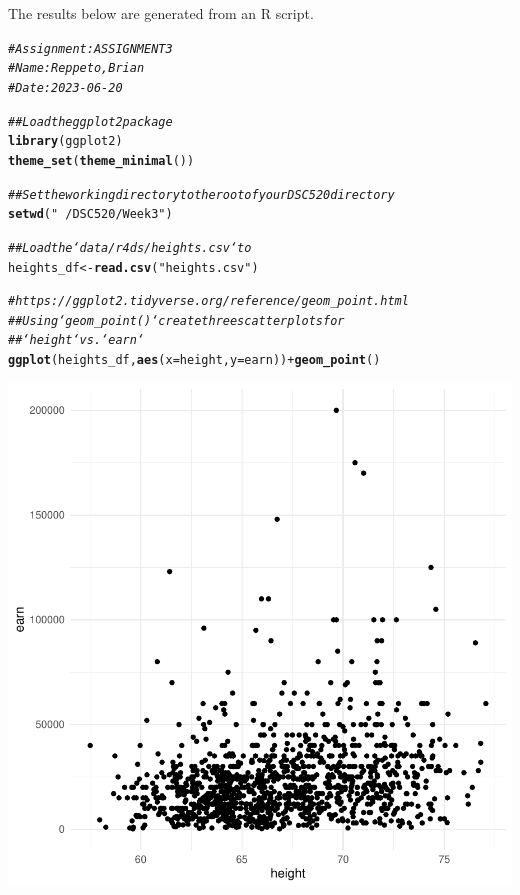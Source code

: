 \documentclass{article}\usepackage[]{graphicx}\usepackage[]{xcolor}
\makeatletter
\newcommand{\hlstr}[1]{\textcolor[rgb]{0.192,0.494,0.8}{#1}}%
\newcommand{\hlcom}[1]{\textcolor[rgb]{0.678,0.584,0.686}{\textit{#1}}}%
\newcommand{\hlopt}[1]{\textcolor[rgb]{0,0,0}{#1}}%
\newcommand{\hlstd}[1]{\textcolor[rgb]{0.345,0.345,0.345}{#1}}%
\newcommand{\hlkwb}[1]{\textcolor[rgb]{0.69,0.353,0.396}{#1}}%
\newcommand{\hlkwc}[1]{\textcolor[rgb]{0.333,0.667,0.333}{#1}}%
\newcommand{\hlkwd}[1]{\textcolor[rgb]{0.737,0.353,0.396}{\textbf{#1}}}%
\newenvironment{kframe}{%
 \def\at@end@of@kframe{}%
 \ifinner\ifhmode%
  \def\at@end@of@kframe{\end{minipage}}%
  \begin{minipage}{\columnwidth}%
 \fi\fi%
 \def\FrameCommand##1{\hskip\@totalleftmargin \hskip-\fboxsep
 \colorbox{shadecolor}{##1}\hskip-\fboxsep
     \hskip-\linewidth \hskip-\@totalleftmargin \hskip\columnwidth}%
 \MakeFramed {\advance\hsize-\width
   \@totalleftmargin\z@ \linewidth\hsize
   \@setminipage}}%
 {\par\unskip\endMakeFramed%
 \at@end@of@kframe}
\newenvironment{knitrout}{}{} %
\makeatother
\begin{document}
\title{\title{}}



\maketitle
The results below are generated from an R script.

\begin{knitrout}
\color{fgcolor}\begin{kframe}
\begin{alltt}
\hlcom{# Assignment: ASSIGNMENT 3}
\hlcom{# Name: Reppeto, Brian}
\hlcom{# Date: 2023-06-20}

\hlcom{## Load the ggplot2 package}
\hlkwd{library}\hlstd{(ggplot2)}
\hlkwd{theme_set}\hlstd{(}\hlkwd{theme_minimal}\hlstd{())}

\hlcom{## Set the working directory to the root of your DSC 520 directory}
\hlkwd{setwd}\hlstd{(}\hlstr{"~/DSC520/Week 3"}\hlstd{)}

\hlcom{## Load the `data/r4ds/heights.csv` to}
\hlstd{heights_df} \hlkwb{<-} \hlkwd{read.csv}\hlstd{(}\hlstr{"heights.csv"}\hlstd{)}

\hlcom{# https://ggplot2.tidyverse.org/reference/geom_point.html}
\hlcom{## Using `geom_point()` create three scatterplots for}
\hlcom{## `height` vs. `earn`}
\hlkwd{ggplot}\hlstd{(heights_df,} \hlkwd{aes}\hlstd{(}\hlkwc{x}\hlstd{=height,} \hlkwc{y}\hlstd{=earn))} \hlopt{+} \hlkwd{geom_point}\hlstd{()}
\end{alltt}
\end{kframe}

{\centering \includegraphics[width=.6\linewidth]{figure/assignment-03-Reppeto-Brian-Rnwauto-report-1} 

}



\end{knitrout}
\end{document}
